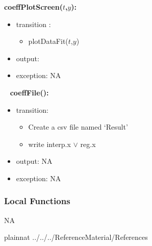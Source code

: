 \documentclass[12pt, titlepage]{article}
\begin{document}
\noindent \textbf{coeffPlotScreen($t$,$y$):}
\begin{itemize}
	\item transition :
	\begin{itemize}
		\item plotDataFit($t$,$y$)
	\end{itemize}
	\item output:  
	\item exception: NA
\end{itemize}


~\newline
\noindent \textbf{coeffFile():}
\begin{itemize}
	\item transition: 
	\begin{itemize}
		
		\item Create a csv file named `Result'
		\item write interp.x $\lor$ reg.x
	\end{itemize}
	\item output: NA
	\item exception: NA 
\end{itemize}




\subsubsection{Local Functions}

NA






\newpage




 {plainnat}
 {../../../ReferenceMaterial/References}

\newpage




\end{document}
